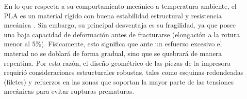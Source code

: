 En lo que respecta a su comportamiento mecánico a temperatura ambiente, el PLA es un material rígido con buena estabilidad estructural y resistencia mecánica \cite{chanda2006}. Sin embargo, su principal desventaja es su fragilidad, ya que posee una baja capacidad de deformación antes de fracturarse (elongación a la rotura menor al 5\%)\cite{callister2020}. Físicamente, esto significa que ante un esfuerzo excesivo el material no se doblará de forma gradual, sino que se quebrará de manera repentina. Por esta razón, el diseño geométrico de las piezas de la impresora requirió consideraciones estructurales robustas, tales como esquinas redondeadas (filetes) y refuerzos en las zonas que soportan la mayor parte de las tensiones mecánicas para evitar rupturas prematuras.

